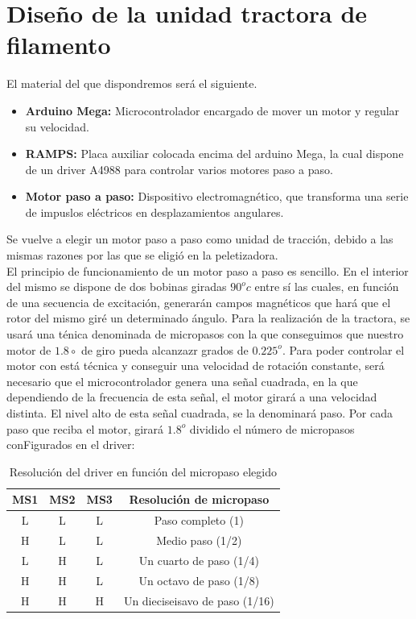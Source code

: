 
\chapter{Diseño de la unidad tractora de filamento}
\label{ane:tractora}
El material del que dispondremos será el siguiente.

\begin{itemize}
	\item{\textbf{Arduino Mega:} Microcontrolador encargado de mover un motor y regular su velocidad.}
	\item{\textbf{RAMPS:} Placa auxiliar colocada encima del arduino Mega, la cual dispone de un driver A4988 para controlar varios motores paso a paso.}
	\item{\textbf{Motor paso a paso:} Dispositivo electromagnético, que transforma una serie de impuslos eléctricos en desplazamientos angulares.}
\end{itemize}

Se vuelve a elegir un motor paso a paso como unidad de tracción, debido a las mismas razones por las que se eligió en la peletizadora.\\

El principio de funcionamiento de un motor paso a paso es sencillo. En el interior del mismo se dispone de dos bobinas giradas $90^oc$ entre sí \cite{pasoapaso} las cuales, en función de una secuencia de excitación, generarán campos magnéticos que hará que el rotor del mismo giré un determinado ángulo. Para la realización de la tractora, se usará una ténica denominada de micropasos con la que conseguimos que nuestro motor de $1.8 \circ$ de giro pueda alcanzazr grados de $0.225^o$. Para poder controlar el motor con está técnica y conseguir una velocidad de rotación constante, será necesario que el microcontrolador genera una señal cuadrada, en la que dependiendo de la frecuencia de esta señal, el motor girará a una velocidad distinta. El nivel alto de esta señal cuadrada, se la denominará paso. Por cada paso que reciba el motor, girará $1.8^o $ dividido el número de micropasos conFigurados en el driver:

\begin{table}[H]
    \centering
    \begin{tabular}{cccc}
        {\bf MS1} & {\bf MS2} & {\bf MS3} & {\bf Resolución de micropaso}  \\
        \hline
        L         & L         & L         & Paso completo (1)              \\
        H         & L         & L         & Medio paso (1/2)               \\
        L         & H         & L         & Un cuarto de paso (1/4)        \\
        H         & H         & L         & Un octavo de paso (1/8)        \\
        H         & H         & H         & Un dieciseisavo de paso (1/16)
    \end{tabular}
    \caption{Resolución del driver en función del micropaso elegido}
    \label{tab:res_drive}
\end{table}

